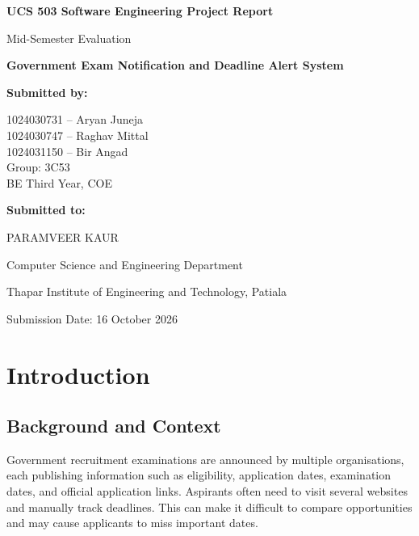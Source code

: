 \documentclass[12pt,a4paper]{report}
\begin{document}
\begin{titlepage}
\centering
\vspace*{0.7cm}
{\large\textbf{UCS 503 Software Engineering Project Report}\par}
{\large Mid-Semester Evaluation\par}
\vspace{2.0cm}
{\Huge\bfseries Government Exam Notification and Deadline Alert System\par}
\vspace{0.8cm}


\vspace{1.2cm}
{\large\textbf{Submitted by:}\par}
\vspace{0.35cm}
{\large
1024030731 -- Aryan Juneja\\
1024030747 -- Raghav Mittal\\
1024031150 -- Bir Angad\\[0.3cm]
Group: 3C53\\
BE Third Year, COE\par}
\vspace{1.0cm}
{\large\textbf{Submitted to:}\par}
\vspace{0.2cm}
{\large PARAMVEER KAUR\par}
\vfill
{\large Computer Science and Engineering Department\par}
{\large Thapar Institute of Engineering and Technology, Patiala\par}
\vspace{0.4cm}
{\large Submission Date: 16 October 2026\par}
\end{titlepage}

\tableofcontents
\clearpage
{}

\chapter{Introduction}

\section{Background and Context}
Government recruitment examinations are announced by multiple organisations, each publishing information such as eligibility, application dates, examination dates, and official application links. Aspirants often need to visit several websites and manually track deadlines. This can make it difficult to compare opportunities and may cause applicants to miss important dates.
\end{document}
